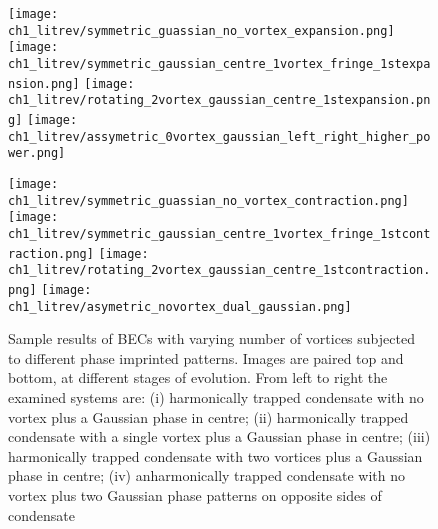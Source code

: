 \begin{figure}[tb]
\begin{center}
	\texttt{[image: ch1\_litrev/symmetric\_guassian\_no\_vortex\_expansion.png]}\vspace{0.1em}
	\texttt{[image: ch1\_litrev/symmetric\_gaussian\_centre\_1vortex\_fringe\_1stexpansion.png]}
	\texttt{[image: ch1\_litrev/rotating\_2vortex\_gaussian\_centre\_1stexpansion.png]}
	\texttt{[image: ch1\_litrev/assymetric\_0vortex\_gaussian\_left\_right\_higher\_power.png]}
	
	
	\texttt{[image: ch1\_litrev/symmetric\_guassian\_no\_vortex\_contraction.png]}
	\texttt{[image: ch1\_litrev/symmetric\_gaussian\_centre\_1vortex\_fringe\_1stcontraction.png]}
	\texttt{[image: ch1\_litrev/rotating\_2vortex\_gaussian\_centre\_1stcontraction.png]}
	\texttt{[image: ch1\_litrev/asymetric\_novortex\_dual\_gaussian.png]}
\end{center}\vspace*{0pt}\caption{Sample results of BECs with varying number of vortices subjected to different phase imprinted patterns. Images are paired top and bottom, at different stages of evolution. From left to right the examined systems are: (i) harmonically trapped condensate with no vortex plus a Gaussian phase in centre; (ii) harmonically trapped condensate with a single vortex plus a Gaussian phase in centre; (iii) harmonically trapped condensate with two vortices plus a Gaussian phase in centre; (iv) anharmonically trapped condensate with no vortex plus two Gaussian phase patterns on opposite sides of condensate\vspace*{-10pt}}\label{FIG:bec_fringe}
\end{figure}

